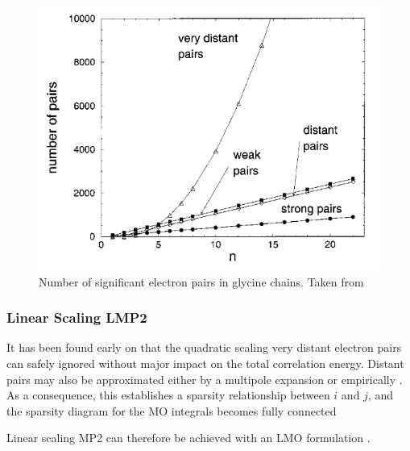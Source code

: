 \begin{figure}
\centering
\includegraphics[scale=0.5]{Pics/electron_pairs.png}
\caption[Number of significant electron pairs in glycine chains.]{Number of significant electron pairs in glycine chains. Taken from \cite{Sch1999}}
\label{fig:EPAIRS}
\end{figure}

\subsubsection{Linear Scaling LMP2}

It has been found \cite{Sae1987} early on that the quadratic scaling very distant electron pairs can safely ignored without major impact on the total correlation energy. Distant pairs may also be approximated either by a multipole expansion \cite{Het1998} or empirically \cite{Rau1995}. As a consequence, this establishes a sparsity relationship between $i$ and $j$, and the sparsity diagram for the MO integrals becomes fully connected
\begin{center}
\end{center}
\noindent Linear scaling MP2 can therefore be achieved with an LMO formulation \cite{Sch1999}.

